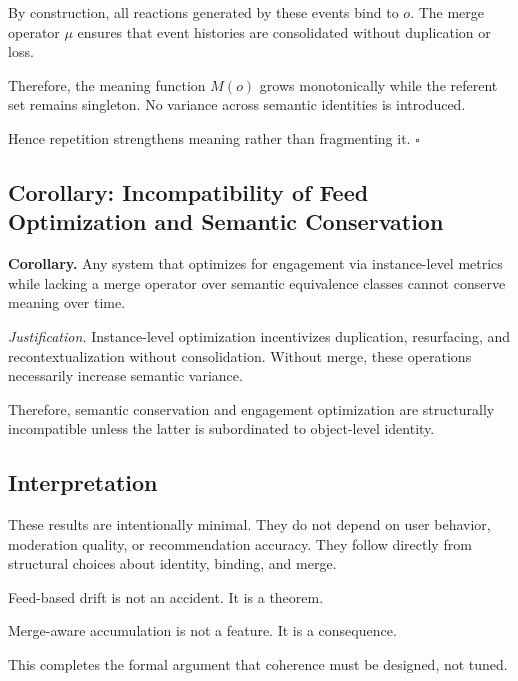 \documentclass[11pt,oneside]{article}
\begin{document}
By construction, all reactions generated by these events bind to $o$. The merge operator $\mu$ ensures that event histories are consolidated without duplication or loss.

Therefore, the meaning function $M(o)$ grows monotonically while the referent set remains singleton. No variance across semantic identities is introduced.

Hence repetition strengthens meaning rather than fragmenting it. \hfill $\square$

\subsection{Corollary: Incompatibility of Feed Optimization and Semantic Conservation}

\textbf{Corollary.}  
Any system that optimizes for engagement via instance-level metrics while lacking a merge operator over semantic equivalence classes cannot conserve meaning over time.

\emph{Justification.}  
Instance-level optimization incentivizes duplication, resurfacing, and recontextualization without consolidation. Without merge, these operations necessarily increase semantic variance.

Therefore, semantic conservation and engagement optimization are structurally incompatible unless the latter is subordinated to object-level identity.

\subsection{Interpretation}

These results are intentionally minimal. They do not depend on user behavior, moderation quality, or recommendation accuracy. They follow directly from structural choices about identity, binding, and merge.

Feed-based drift is not an accident. It is a theorem.

Merge-aware accumulation is not a feature. It is a consequence.

This completes the formal argument that coherence must be designed, not tuned.
\end{document}
